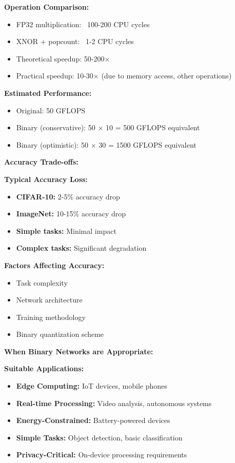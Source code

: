 \documentclass[12pt]{article}
\begin{document}
\begin{enumerate}[(a)]
{    \textbf{Operation Comparison:}
    \begin{itemize}
        \item FP32 multiplication: ~100-200 CPU cycles
        \item XNOR + popcount: ~1-2 CPU cycles
        \item Theoretical speedup: 50-200×
        \item Practical speedup: 10-30× (due to memory access, other operations)
    \end{itemize}
    
    \textbf{Estimated Performance:}
    \begin{itemize}
        \item Original: 50 GFLOPS
        \item Binary (conservative): 50 × 10 = 500 GFLOPS equivalent
        \item Binary (optimistic): 50 × 30 = 1500 GFLOPS equivalent
    \end{itemize}
    
    \textbf{Accuracy Trade-offs:}
    
    \textbf{Typical Accuracy Loss:}
    \begin{itemize}
        \item \textbf{CIFAR-10:} 2-5\% accuracy drop
        \item \textbf{ImageNet:} 10-15\% accuracy drop
        \item \textbf{Simple tasks:} Minimal impact
        \item \textbf{Complex tasks:} Significant degradation
    \end{itemize}
    
    \textbf{Factors Affecting Accuracy:}
    \begin{itemize}
        \item Task complexity
        \item Network architecture
        \item Training methodology
        \item Binary quantization scheme
    \end{itemize}
    
    \textbf{When Binary Networks are Appropriate:}
    
    \textbf{Suitable Applications:}
    \begin{itemize}
        \item \textbf{Edge Computing:} IoT devices, mobile phones
        \item \textbf{Real-time Processing:} Video analysis, autonomous systems
        \item \textbf{Energy-Constrained:} Battery-powered devices
        \item \textbf{Simple Tasks:} Object detection, basic classification
        \item \textbf{Privacy-Critical:} On-device processing requirements
    \end{itemize}
    
}
\end{enumerate}
\end{document}
